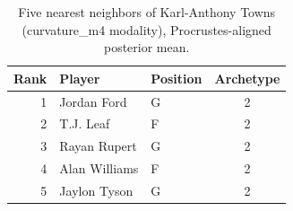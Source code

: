 \begin{table}[htbp]
  \centering\small
  \begin{tabular}{rllc}
    \toprule
    Rank & Player & Position & Archetype \\
    \midrule
    1 & Jordan Ford & G & 2 \\
    2 & T.J. Leaf & F & 2 \\
    3 & Rayan Rupert & G & 2 \\
    4 & Alan Williams & F & 2 \\
    5 & Jaylon Tyson & G & 2 \\
    \bottomrule
  \end{tabular}
  \caption{Five nearest neighbors of Karl-Anthony Towns (curvature_m4 modality), Procrustes-aligned posterior mean.}
  \label{tab:Karl_Anthony_Towns_neighbors_curvature_m4}
\end{table}

